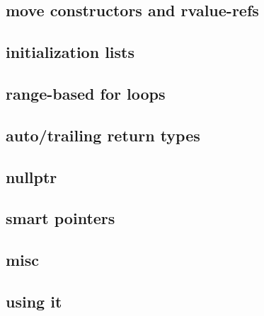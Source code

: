 

\subsection{move constructors and rvalue-refs}



\subsection{initialization lists}



\subsection{range-based for loops}



\subsection{auto/trailing return types}





\subsection{nullptr}



\subsection{smart pointers}



\subsection{misc}



\subsection{using it}


